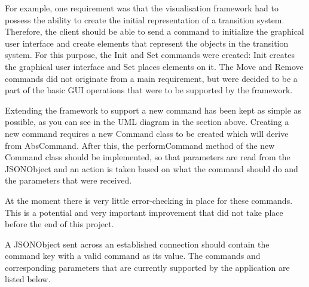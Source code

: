 \documentclass[11pt,a4paper]{article}
\begin{document}
For example, one requirement was that the visualisation framework had to possess the ability to create the initial representation of a transition system. Therefore, the client should be able to send a command to initialize the graphical user interface and create elements that represent the objects in the transition system. For this purpose, the Init and Set commands were created: Init creates the graphical user interface and Set places elements on it. The Move and Remove commands did not originate from a main requirement, but were decided to be a part of the basic GUI operations that were to be supported by the framework.

Extending the framework to support a new command has been kept as simple as possible, as you can see in the UML diagram in the section above. Creating a new command requires a new Command class to be created which will derive from AbsCommand. After this, the performCommand method of the new Command class should be implemented, so that parameters are read from the JSONObject and an action is taken based on what the command should do and the parameters that were received.

At the moment there is very little error-checking in place for these commands. This is a potential and very important improvement that did not take place before the end of this project.

A JSONObject sent across an established connection should contain the command key with a valid command as its value. The commands and corresponding parameters that are currently supported by the application are listed below.
\end{document}
